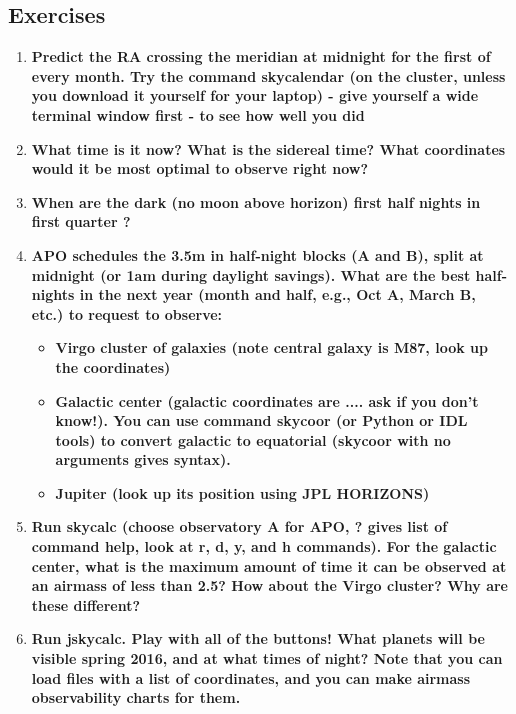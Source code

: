 \documentclass[12pt]{article}
\begin{document}
\subsection*{Exercises}
\begin{enumerate}[1.]
    \item \textbf{Predict the RA crossing the meridian at midnight for the
    first of every month. Try the command skycalendar (on the cluster,
    unless you download it yourself for your laptop) - give yourself a
    wide terminal window first - to see how well you did}

    \item \textbf{What time is it now? What is the sidereal time? What
    coordinates would it be most optimal to observe right now?}

    \item \textbf{When are the dark (no moon above horizon) first half
    nights in first quarter ? }

    \item \textbf{APO schedules the 3.5m in half-night blocks (A and
    B), split at midnight (or 1am during daylight savings). What are
    the best half-nights in the next year (month and half, e.g., Oct
    A, March B, etc.) to request to observe:}
        \begin{itemize}
            \item \textbf{Virgo cluster of galaxies (note central
            galaxy is M87, look up the coordinates)}
            \item \textbf{Galactic center (galactic coordinates are
            .... ask if you don't know!). You can use command skycoor
            (or Python or IDL tools) to convert galactic to equatorial
            (skycoor with no arguments gives syntax). }
            \item \textbf{Jupiter (look up its position using JPL
            HORIZONS) }
        \end{itemize}

    \item \textbf{Run skycalc (choose observatory A for APO, ? gives
    list of command help, look at r, d, y, and h commands). For the
    galactic center, what is the maximum amount of time it can be
    observed at an airmass of less than 2.5? How about the Virgo
    cluster? Why are these different?}

    \item \textbf{Run jskycalc. Play with all of the buttons! What
    planets will be visible spring 2016, and at what times of night?
    Note that you can load files with a list of coordinates, and you
    can make airmass observability charts for them.}


\end{enumerate}
\end{document}
